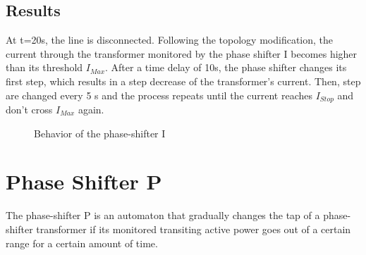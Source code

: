 \documentclass[a4paper, 12pt]{report}
\begin{document}
\newpage
\subsection{Results}

At t=20s, the line is disconnected. Following the topology modification, the current through the transformer monitored by the phase shifter I becomes higher than its threshold $I_{Max}$. After a time delay of 10s, the phase shifter changes its first step, which results in a step decrease of the transformer's current. Then, step are changed every 5 s and the process repeats until the current reaches $I_{Stop}$ and don't cross $I_{Max}$ again. \\

\begin{figure}[H]
\caption{Behavior of the phase-shifter I}
\end{figure}


\newpage
\section{Phase Shifter P}
\label{PhaseShifterPAutomaton}

The phase-shifter P is an automaton that gradually changes the tap of a phase-shifter transformer if its monitored transiting active power goes out of a certain range for a certain amount of time.
\end{document}
